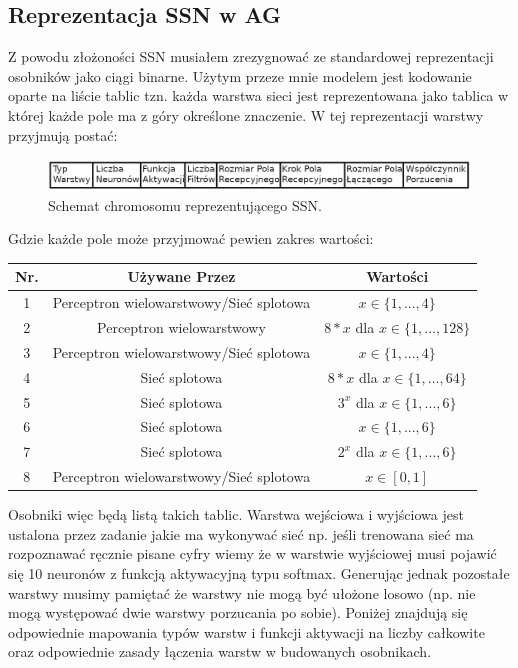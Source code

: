 \documentclass{article}
\begin{document}
\subsection{Reprezentacja SSN w AG}
Z powodu złożoności SSN musiałem zrezygnować ze standardowej reprezentacji osobników 
jako ciągi binarne. Użytym przeze mnie modelem jest kodowanie oparte na liście tablic tzn.
każda warstwa sieci jest reprezentowana jako tablica w której każde pole ma z góry określone 
znaczenie. W tej reprezentacji warstwy przyjmują postać:\\
\begin{figure}[H]
\centering
\includegraphics[scale=0.30]{dnn_genome.png}
\caption{Schemat chromosomu reprezentującego SSN.}
\end{figure}
Gdzie każde pole może przyjmować pewien zakres wartości:\\
\begin{center}
\begin{tabular}{|c|c|c|}
	\hline
	Nr. & Używane Przez & Wartości \\
	\hline
	1 & Perceptron wielowarstwowy/Sieć splotowa & $x \in \{1, ...,4\}$\\
	2 & Perceptron wielowarstwowy & $8*x$ dla $x\in \{1, ...,128\}$\\
	3 & Perceptron wielowarstwowy/Sieć splotowa & $x \in \{1, ...,4\}$\\
	4 & Sieć splotowa & $8*x$ dla $x\in \{1, ...,64\}$\\
	5 & Sieć splotowa & $3^x$ dla $x \in \{1, ...,6\}$\\
	6 & Sieć splotowa & $x \in \{1, ...,6\}$\\
	7 & Sieć splotowa & $2^x$ dla $x \in \{1, ...,6\}$\\
	8 & Perceptron wielowarstwowy/Sieć splotowa & $x \in [0, 1]$\\
	\hline
\end{tabular}
\label{tab:params}
\end{center}

Osobniki więc będą listą takich tablic.
Warstwa wejściowa i wyjściowa jest ustalona 
przez zadanie jakie ma wykonywać sieć np. jeśli trenowana sieć ma rozpoznawać ręcznie pisane
cyfry wiemy że w warstwie  wyjściowej musi pojawić się 10 neuronów z funkcją aktywacyjną
typu softmax.
Generując jednak pozostałe warstwy musimy pamiętać że warstwy nie mogą być ułożone losowo
(np. nie mogą występować dwie warstwy porzucania po sobie). Poniżej znajdują się odpowiednie
mapowania typów warstw i funkcji aktywacji na liczby całkowite oraz odpowiednie zasady 
łączenia warstw w budowanych osobnikach.\\
\end{document}
